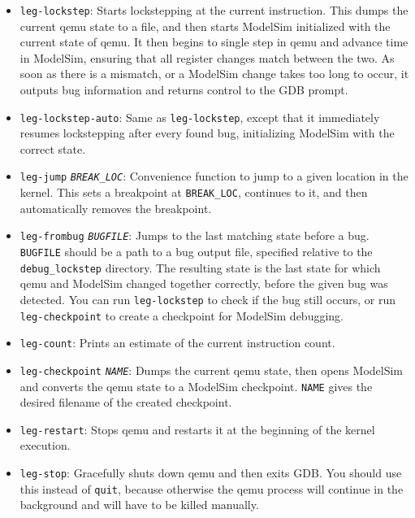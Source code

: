 \begin{itemize}
\item \texttt{leg-lockstep}: Starts lockstepping at the current instruction. This dumps the current qemu state to a file, and then starts ModelSim initialized with the current state of qemu. It then begins to single step in qemu and advance time in ModelSim, ensuring that all register changes match between the two. As soon as there is a mismatch, or a ModelSim change takes too long to occur, it outputs bug information and returns control to the GDB prompt.
\item \texttt{leg-lockstep-auto}: Same as \texttt{leg-lockstep}, except that it immediately resumes lockstepping after every found bug, initializing ModelSim with the correct state.
\item \texttt{leg-jump} \texttt{\emph{BREAK\_LOC}}: Convenience function to jump to a given location in the kernel. This sets a breakpoint at \texttt{BREAK\_LOC}, continues to it, and then automatically removes the breakpoint.
\item \texttt{leg-frombug} \texttt{\emph{BUGFILE}}: Jumps to the last matching state before a bug. \texttt{BUGFILE} should be a path to a bug output file, specified relative to the \texttt{debug\_lockstep} directory. The resulting state is the last state for which qemu and ModelSim changed together correctly, before the given bug was detected. You can run \texttt{leg-lockstep} to check if the bug still occurs, or run \texttt{leg-checkpoint} to create a checkpoint for ModelSim debugging.
\item \texttt{leg-count}: Prints an estimate of the current instruction count.
\item \texttt{leg-checkpoint} \texttt{\emph{NAME}}: Dumps the current qemu state, then opens ModelSim and converts the qemu state to a ModelSim checkpoint. \texttt{NAME} gives the desired filename of the created checkpoint.
\item \texttt{leg-restart}: Stops qemu and restarts it at the beginning of the kernel execution.
\item \texttt{leg-stop}: Gracefully shuts down qemu and then exits GDB. You should use this instead of \texttt{quit}, because otherwise the qemu process will continue in the background and will have to be killed manually.
\end{itemize}